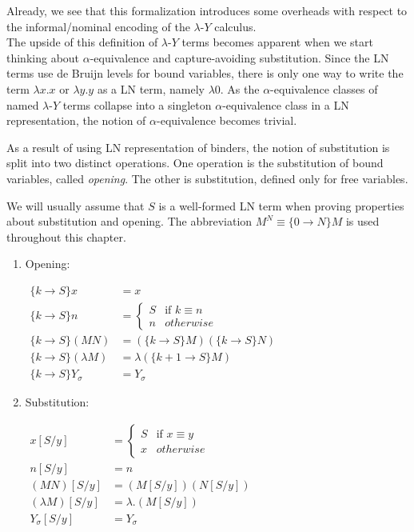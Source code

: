 \documentclass[a4paper, 12pt, twoside]{style/ociamthesis}
\theoremstyle{plain}
\theoremstyle{definition}
\newtheorem{Definition}{Definition}[chapter]
\theoremstyle{remark}
\providecommand{\tightlist}{%
  \setlength{\itemsep}{0pt}\setlength{\parskip}{0pt}}
\newcommand{\lamy}{\lambda\text{-}Y}
\renewenvironment{Definition}{\begin{OldDefinition}\begin{mdframed}[style=example, linecolor=cyan]}{\end{mdframed}\end{OldDefinition}}
\begin{document}
Already, we see that this formalization introduces some overheads with
respect to the informal/nominal encoding of the \(\lamy\) calculus.\\
The upside of this definition of \(\lamy\) terms becomes apparent when
we start thinking about \(\alpha\)-equivalence and capture-avoiding
substitution. Since the LN terms use de Bruijn levels for bound
variables, there is only one way to write the term \(\lambda x.x\) or
\(\lambda y.y\) as a LN term, namely \(\lambda 0\). As the
\(\alpha\)-equivalence classes of named \(\lamy\) terms collapse into a
singleton \(\alpha\)-equivalence class in a LN representation, the
notion of \(\alpha\)-equivalence becomes trivial.

As a result of using LN representation of binders, the notion of
substitution is split into two distinct operations. One operation is the
substitution of bound variables, called \emph{opening}. The other is
substitution, defined only for free variables.

\begin{Definition}[Opening and substitution]

We will usually assume that \(S\) is a well-formed LN term when proving
properties about substitution and opening. The abbreviation
\(M^N \equiv \{0 \to N\}M\) is used throughout this chapter.

\begin{enumerate}
\def\labelenumi{\roman{enumi})}
\tightlist
\item
  Opening:

  \begin{center}
  $\begin{aligned}
  \{k \to S\}x &= x\\
  \{k \to S\}n &= \begin{cases}
  S & \text{if }k \equiv n\\
  n & otherwise
  \end{cases}\\
  \{k \to S\}(MN) &= (\{k \to S\}M)(\{k \to S\}N)\\
  \{k \to S\}(\lambda M) &= \lambda (\{k+1 \to S\}M)\\
  \{k \to S\}Y_\sigma &= Y_\sigma
  \end{aligned}$
  \end{center}
\item
  Substitution:

  \begin{center}
  $\begin{aligned}
  x[S/y] &= \begin{cases}
  S & \text{if }x \equiv y\\
  x & otherwise
  \end{cases}\\
  n[S/y] &= n \\
  (MN)[S/y] &= (M[S/y])(N[S/y])\\
  (\lambda M)[S/y] &= \lambda. (M[S/y])\\
  Y_\sigma[S/y] &= Y_\sigma
  \end{aligned}$
  \end{center}
\end{enumerate}

\end{Definition}
\end{document}
